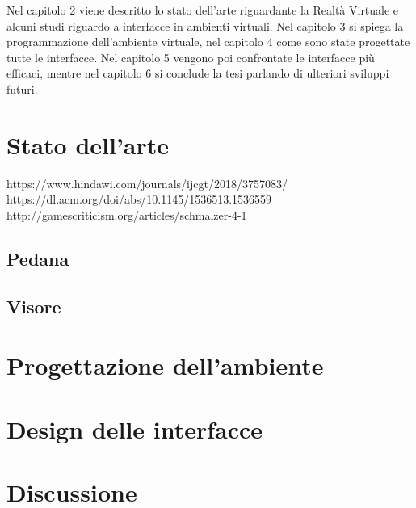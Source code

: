\documentclass[target=bach,aauheader=]{thud}
\begin{document}
Nel capitolo 2 viene descritto lo stato dell'arte riguardante la Realtà Virtuale e alcuni studi riguardo a interfacce in ambienti virtuali.
Nel capitolo 3 si spiega la programmazione dell'ambiente virtuale, nel capitolo 4 come sono state progettate tutte le interfacce.
Nel capitolo 5 vengono poi confrontate le interfacce più efficaci, mentre nel capitolo 6 si conclude la tesi parlando di ulteriori sviluppi futuri.


\chapter{Stato dell'arte} %
https://www.hindawi.com/journals/ijcgt/2018/3757083/ \\ %
https://dl.acm.org/doi/abs/10.1145/1536513.1536559 \\ %
http://gamescriticism.org/articles/schmalzer-4-1 \\ %



\section{Pedana}

\section{Visore}

\chapter{Progettazione dell'ambiente} %

\chapter{Design delle interfacce} %

\chapter{Discussione}
\end{document}
